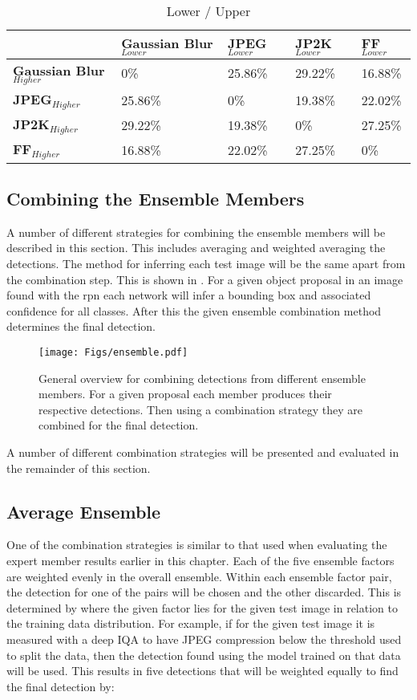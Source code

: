 \documentclass[a4paper,twoside]{article}
\begin{document}
\begin{table}[]
\centering
\caption{Lower / Upper}
\label{tab:lowhighcomp}
\begin{tabular}{|l|l|l|l|l|}
\hline
                 & \textbf{Gaussian Blur$_{Lower}$} & \textbf{JPEG$_{Lower}$} & \textbf{JP2K$_{Lower}$} & \textbf{FF$_{Lower}$} \\ \hline
\textbf{Gaussian Blur$_{Higher}$}  & 0\%             & 25.86\% & 29.22\% & 16.88\%    \\ \hline
\textbf{JPEG$_{Higher}$} & 25.86\%      & 0\%        & 19.38\% & 22.02\%    \\ \hline
\textbf{JP2K$_{Higher}$} & 29.22\%      & 19.38\% & 0\%        & 27.25\%    \\ \hline
\textbf{FF$_{Higher}$} & 16.88\%      & 22.02\% & 27.25\% & 0\%           \\ \hline
\end{tabular}
\end{table}

\subsection{Combining the Ensemble Members}
A number of different strategies for combining the ensemble members will be described in this section. This includes averaging and weighted averaging the detections. The method for inferring each test image will be the same apart from the combination step. This is shown in . For a given object proposal in an image found with the \gls{rpn} each network will infer a bounding box and associated confidence for all classes. After this the given ensemble combination method determines the final detection. 
\begin{figure}[H]
  \centering
    \texttt{[image: Figs/ensemble.pdf]}
      \caption{General overview for combining detections from different ensemble members. For a given proposal each member produces their respective detections. Then using a combination strategy they are combined for the final detection.}
    \label{fig:ensemble_general}
\end{figure}

A number of different combination strategies will be presented and evaluated in the remainder of this section. 

\subsection{Average Ensemble}
One of the combination strategies is similar to that used when evaluating the expert member results earlier in this chapter. Each of the five ensemble factors are weighted evenly in the overall ensemble. Within each ensemble factor pair, the detection for one of the pairs will be chosen and the other discarded. This is determined by where the given factor lies for the given test image in relation to the training data distribution. For example, if for the given test image it is measured with a deep IQA to have JPEG compression below the threshold used to split the data, then the detection found using the model trained on that data will be used. This results in five detections that will be weighted equally to find the final detection by:
\end{document}
